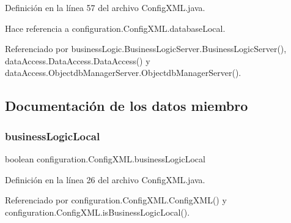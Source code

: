 Definición en la línea 57 del archivo Config\+X\+M\+L.\+java.


\begin{DoxyCode}{0}

\end{DoxyCode}


Hace referencia a configuration.\+Config\+X\+M\+L.\+database\+Local.



Referenciado por business\+Logic.\+Business\+Logic\+Server.\+Business\+Logic\+Server(), data\+Access.\+Data\+Access.\+Data\+Access() y data\+Access.\+Objectdb\+Manager\+Server.\+Objectdb\+Manager\+Server().



\subsection{Documentación de los datos miembro}
\mbox{\label{classconfiguration_1_1_config_x_m_l_ab30a83d21460a743a7a86955de08da3a}} 
\subsubsection{\texorpdfstring{businessLogicLocal}{businessLogicLocal}}
{\footnotesize\ttfamily boolean configuration.\+Config\+X\+M\+L.\+business\+Logic\+Local\hspace{0.3cm}{\ttfamily [private]}}



Definición en la línea 26 del archivo Config\+X\+M\+L.\+java.



Referenciado por configuration.\+Config\+X\+M\+L.\+Config\+X\+M\+L() y configuration.\+Config\+X\+M\+L.\+is\+Business\+Logic\+Local().

\mbox{\label{classconfiguration_1_1_config_x_m_l_ad0228d23b69947a3e6ad84db4d893369}} 
